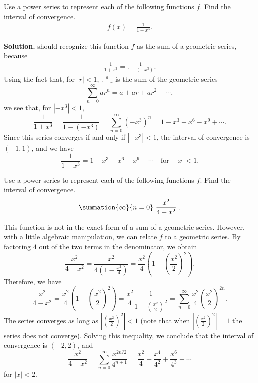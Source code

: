 \documentclass{report}
\begin{document}
    \bigbreak \noindent 
    \begin{eg}
       Use a power series to represent each of the following functions  $f$. Find the interval of convergence. 
       \begin{align*}
           f(x) = \frac{1}{1+x^{3}}
       .\end{align*}
    \end{eg}
    \bigbreak \noindent 
    \textbf{Solution.} should recognize this function $f$ as the sum of a geometric series, because
    \begin{align*}
        \frac{1}{1+x^{3}} = \frac{1}{1-(-x^{3})}
    .\end{align*}
    Using the fact that, for \( |r| < 1 \), \(\frac{a}{1 - r}\) is the sum of the geometric series
\[
    \sum_{n=0}^{\infty} ar^n = a + ar + ar^2 + \cdots,
\]
we see that, for \( \left| -x^3 \right| < 1 \),
\[
    \frac{1}{1 + x^3} = \frac{1}{1 - (-x^3)} = \sum_{n=0}^{\infty} (-x^3)^n = 1 - x^3 + x^6 - x^9 + \cdots.
\]
Since this series converges if and only if \( \left| -x^3 \right| < 1 \), the interval of convergence is \( (-1, 1) \), and we have
\[
    \frac{1}{1 + x^3} = 1 - x^3 + x^6 - x^9 + \cdots \quad \text{for} \quad |x| < 1.
\]


    \pagebreak \bigbreak \noindent 
    \begin{eg}
       Use a power series to represent each of the following functions  $f$. Find the interval of convergence. 
       \begin{align*}
           \summation{\infty}{n=0}\ \frac{x^{2}}{4-x^{2}}\ 
       .\end{align*}
    \end{eg}
    \bigbreak \noindent 
    This function is not in the exact form of a sum of a geometric series. However, with a little algebraic manipulation, we can relate \( f \) to a geometric series. By factoring \( 4 \) out of the two terms in the denominator, we obtain
    \[
        \frac{x^2}{4 - x^2} = \frac{x^2}{4(1 - \frac{x^2}{4})} = \frac{x^2}{4}\left(1 - \left(\frac{x^2}{2}\right)^2\right).
    \]
    \bigbreak \noindent 
    Therefore, we have
    \[
        \frac{x^2}{4 - x^2} = \frac{x^2}{4}\left(1 - \left(\frac{x^2}{2}\right)^2\right) = \frac{x^2}{4}\frac{1}{1 - \left(\frac{x^2}{2}\right)^2} = \sum_{n=0}^{\infty} \frac{x^2}{4}\left(\frac{x^2}{2}\right)^{2n}.
    \]
    \bigbreak \noindent 
    The series converges as long as \( \left|\left(\frac{x^2}{2}\right)^2\right| < 1 \) (note that when \( \left|\left(\frac{x^2}{2}\right)^2\right| = 1 \) the series does not converge). Solving this inequality, we conclude that the interval of convergence is \( (-2, 2) \), and
    \[
        \frac{x^2}{4 - x^2} = \sum_{n=0}^{\infty} \frac{x^{2n?2}}{4^{n+1}} = \frac{x^2}{4} + \frac{x^4}{4^2} + \frac{x^6}{4^3} + \cdots
    \]
    \bigbreak \noindent 
    for \( |x| < 2 \).
\end{document}
